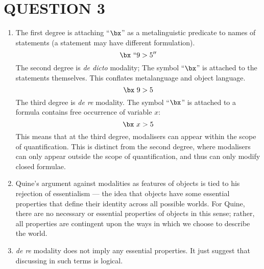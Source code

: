 \section*{QUESTION 3}
\begin{enumerate}[label=\alph*)]
\item
The first degree is attaching ``$\bx$'' as a metalinguistic predicate to names of statements (a statement may have different formulation).
\[ \bx\ ``9 > 5'' \]
The second degree is \textit{de dicto} modality; The symbol ``$\bx$'' is attached to the statements themselves. This conflates metalanguage and object language.
\[ \bx\ 9 > 5 \]
The third degree is \textit{de re} modality. The symbol ``$\bx$'' is attached to a formula contains free occurrence of variable $x$:
\[ \bx\ x > 5 \]
This means that at the third degree, modalisers can appear within the scope of quantification. This is distinct from the second degree, where modalisers can only appear outside the scope of quantification, and thus can only modify closed formulae.

\item
Quine's argument against modalities as features of objects is tied to his rejection of essentialism — the idea that objects have some essential properties that define their identity across all possible worlds. For Quine, there are no necessary or essential properties of objects in this sense; rather, all properties are contingent upon the ways in which we choose to describe the world.

\item
\textit{de re} modality does not imply any essential properties. It just suggest that discussing in such terms is logical.

\end{enumerate}